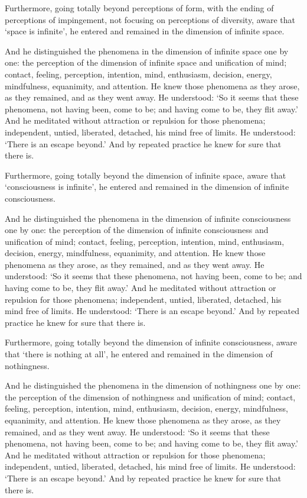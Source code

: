 \documentclass[12pt,openany]{book}%
\begin{document}
Furthermore, going totally beyond perceptions of form, with the ending of perceptions of impingement, not focusing on perceptions of diversity, aware that ‘space is infinite’, he entered and remained in the dimension of infinite space. 

And he distinguished the phenomena in the dimension of infinite space one by one: the perception of the dimension of infinite space and unification of mind; contact, feeling, perception, intention, mind, enthusiasm, decision, energy, mindfulness, equanimity, and attention. He knew those phenomena as they arose, as they remained, and as they went away. He understood: ‘So it seems that these phenomena, not having been, come to be; and having come to be, they flit away.’ And he meditated without attraction or repulsion for those phenomena; independent, untied, liberated, detached, his mind free of limits. He understood: ‘There is an escape beyond.’ And by repeated practice he knew for sure that there is. 

Furthermore, going totally beyond the dimension of infinite space, aware that ‘consciousness is infinite’, he entered and remained in the dimension of infinite consciousness. 

And he distinguished the phenomena in the dimension of infinite consciousness one by one: the perception of the dimension of infinite consciousness and unification of mind; contact, feeling, perception, intention, mind, enthusiasm, decision, energy, mindfulness, equanimity, and attention. He knew those phenomena as they arose, as they remained, and as they went away. He understood: ‘So it seems that these phenomena, not having been, come to be; and having come to be, they flit away.’ And he meditated without attraction or repulsion for those phenomena; independent, untied, liberated, detached, his mind free of limits. He understood: ‘There is an escape beyond.’ And by repeated practice he knew for sure that there is. 

Furthermore, going totally beyond the dimension of infinite consciousness, aware that ‘there is nothing at all’, he entered and remained in the dimension of nothingness. 

And he distinguished the phenomena in the dimension of nothingness one by one: the perception of the dimension of nothingness and unification of mind; contact, feeling, perception, intention, mind, enthusiasm, decision, energy, mindfulness, equanimity, and attention. He knew those phenomena as they arose, as they remained, and as they went away. He understood: ‘So it seems that these phenomena, not having been, come to be; and having come to be, they flit away.’ And he meditated without attraction or repulsion for those phenomena; independent, untied, liberated, detached, his mind free of limits. He understood: ‘There is an escape beyond.’ And by repeated practice he knew for sure that there is. 
\end{document}
